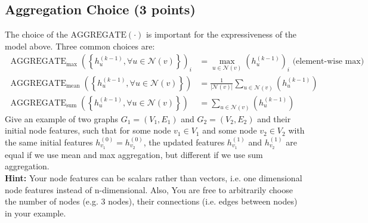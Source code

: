 \documentclass{article}
\numberwithin{figure}{section}
\begin{document}
\subsection{Aggregation Choice (3 points)} 
The choice of the $\operatorname{AGGREGATE(\cdot)}$ is important for the expressiveness of the model above. Three common choices are: $$
\begin{aligned}
\operatorname{AGGREGATE}_{\max }\left(\left\{h_u^{(k-1)}, \forall u \in \mathcal{N}(v)\right\}\right)_i & =\max _{u \in \mathcal{N}(v)}\left(h_u^{(k-1)}\right)_i \text { (element-wise max)} \\
\operatorname{AGGREGATE}_{\text {mean}}\left(\left\{h_u^{(k-1)}, \forall u \in \mathcal{N}(v)\right\}\right) & =\frac{1}{|\mathcal{N}(v)|} \sum_{u \in \mathcal{N}(v)}\left(h_u^{(k-1)}\right) \\
\operatorname{AGGREGATE}_{\text {sum}}\left(\left\{h_u^{(k-1)}, \forall u \in \mathcal{N}(v)\right\}\right) & =\sum_{u \in \mathcal{N}(v)}\left(h_u^{(k-1)}\right)
\end{aligned}
$$
Give an example of two graphs $G_1 = (V_1, E_1)$ and $G_2 = (V_2, E_2)$ and their initial node features, such that for some node $v_1 \in V_1$ and some node $v_2 \in V_2$ with the same initial features $h^{(0)}_{v_1} = h^{(0)}_{v_2}$, the updated features $h^{(1)}_{v_1}$ and $h^{(1)}_{v_2}$ are equal if we use mean and max aggregation, but different if 
we use sum aggregation.\\
\textbf{Hint:} Your node features can be scalars rather than vectors, i.e. one dimensional node features instead of n-dimensional. Also, You are free to arbitrarily choose the number of nodes (e.g. 3 nodes), their connections (i.e. edges between
nodes) in your example.
\end{document}
